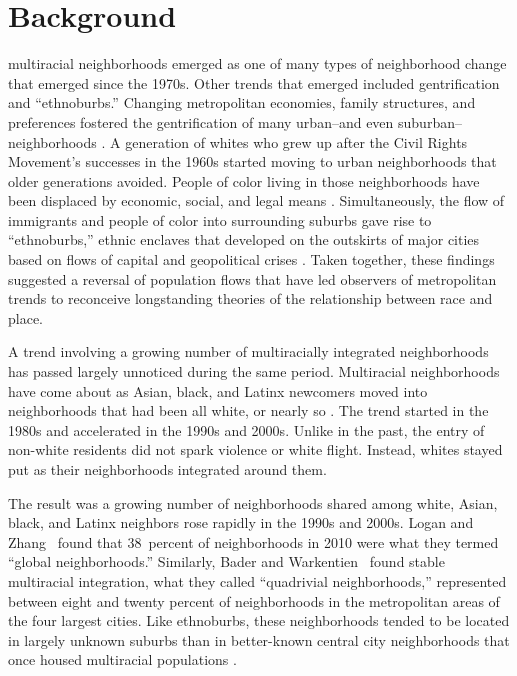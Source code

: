 \documentclass{baderart}
\begin{document}
\section{Background}\label{background}
multiracial neighborhoods emerged as one of many types of neighborhood change that emerged since the 1970s. Other trends that emerged included gentrification and ``ethnoburbs.'' Changing metropolitan economies, family structures, and preferences fostered the gentrification of many urban--and even suburban--neighborhoods \citep{rose_rethinking_1984, slater_gentrification_2004, lung-amam_trespassers?:_2017}. A generation of whites who grew up after the Civil Rights Movement's successes in the 1960s started moving to urban neighborhoods that older generations avoided. People of color living in those neighborhoods have been displaced by economic, social, and legal means \citep{freeman_there_2006, hyra_back---city_2014, hyra_race_2017}. Simultaneously, the flow of immigrants and people of color into surrounding suburbs gave rise to ``ethnoburbs,'' ethnic enclaves that developed on the outskirts of major cities based on flows of capital and geopolitical crises \citep{li_anatomy_1998,  lung-amam_trespassers?:_2017, kye_rise_2018}. Taken together, these findings suggested a reversal of population flows that have led observers of metropolitan trends to reconceive longstanding theories of the relationship between race and place. 

A trend involving a growing number of multiracially integrated neighborhoods has passed largely unnoticed during the same period. Multiracial neighborhoods have come about as Asian, black, and Latinx newcomers moved into neighborhoods that had been all white, or nearly so \citep{logan_global_2010, bader_fragmented_2016} . The trend started in the 1980s and accelerated in the 1990s and 2000s. Unlike in the past, the entry of non-white residents did not spark violence or white flight. Instead, whites stayed put as their neighborhoods integrated around them. 

The result was a growing number of neighborhoods shared among white, Asian, black, and Latinx neighbors rose rapidly in the 1990s and 2000s. Logan and Zhang~\citeyearpar{logan_global_2011} found that 38~percent of neighborhoods in 2010 were what they termed ``global neighborhoods.'' Similarly, Bader and Warkentien~\citeyearpar{bader_fragmented_2016} found stable multiracial integration, what they called ``quadrivial neighborhoods,'' represented between eight and twenty percent of neighborhoods in the metropolitan areas of the four largest cities. Like ethnoburbs, these neighborhoods tended to be located in largely unknown suburbs than in better-known central city neighborhoods that once housed multiracial populations \citep{bader_fragmented_2016, parisi_remaking_2019}. 
\end{document}

